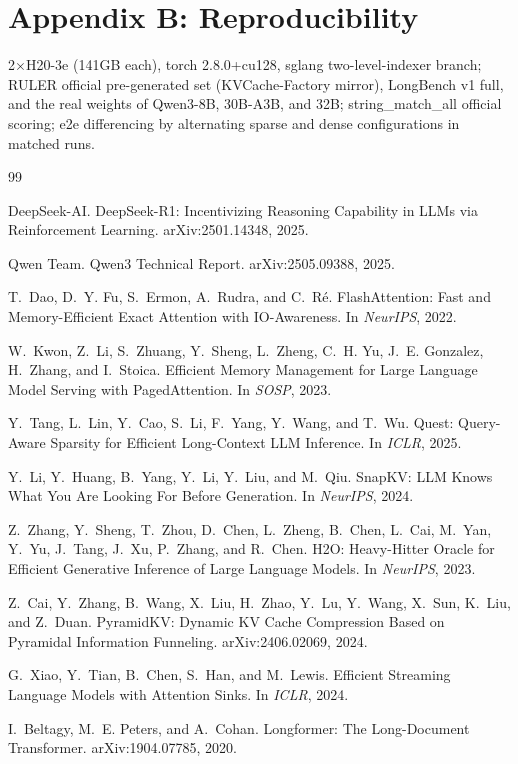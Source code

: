 \documentclass[11pt]{article}
\begin{document}
\section*{Appendix B: Reproducibility}
2$\times$H20-3e (141GB each), torch 2.8.0+cu128, sglang two-level-indexer branch; RULER official pre-generated set (KVCache-Factory mirror), LongBench v1 full, and the real weights of Qwen3-8B, 30B-A3B, and 32B; string\_match\_all official scoring; e2e differencing by alternating sparse and dense configurations in matched runs.


\begin{thebibliography}{99}\small

DeepSeek-AI. DeepSeek-R1: Incentivizing Reasoning Capability in LLMs via Reinforcement Learning. arXiv:2501.14348, 2025.

Qwen Team. Qwen3 Technical Report. arXiv:2505.09388, 2025.

T.~Dao, D.~Y. Fu, S.~Ermon, A.~Rudra, and C.~R\'{e}. FlashAttention: Fast and Memory-Efficient Exact Attention with IO-Awareness. In \emph{NeurIPS}, 2022.

W.~Kwon, Z.~Li, S.~Zhuang, Y.~Sheng, L.~Zheng, C.~H. Yu, J.~E. Gonzalez, H.~Zhang, and I.~Stoica. Efficient Memory Management for Large Language Model Serving with PagedAttention. In \emph{SOSP}, 2023.

Y.~Tang, L.~Lin, Y.~Cao, S.~Li, F.~Yang, Y.~Wang, and T.~Wu. Quest: Query-Aware Sparsity for Efficient Long-Context LLM Inference. In \emph{ICLR}, 2025.

Y.~Li, Y.~Huang, B.~Yang, Y.~Li, Y.~Liu, and M.~Qiu. SnapKV: LLM Knows What You Are Looking For Before Generation. In \emph{NeurIPS}, 2024.

Z.~Zhang, Y.~Sheng, T.~Zhou, D.~Chen, L.~Zheng, B.~Chen, L.~Cai, M.~Yan, Y.~Yu, J.~Tang, J.~Xu, P.~Zhang, and R.~Chen. H2O: Heavy-Hitter Oracle for Efficient Generative Inference of Large Language Models. In \emph{NeurIPS}, 2023.

Z.~Cai, Y.~Zhang, B.~Wang, X.~Liu, H.~Zhao, Y.~Lu, Y.~Wang, X.~Sun, K.~Liu, and Z.~Duan. PyramidKV: Dynamic KV Cache Compression Based on Pyramidal Information Funneling. arXiv:2406.02069, 2024.

G.~Xiao, Y.~Tian, B.~Chen, S.~Han, and M.~Lewis. Efficient Streaming Language Models with Attention Sinks. In \emph{ICLR}, 2024.

I.~Beltagy, M.~E. Peters, and A.~Cohan. Longformer: The Long-Document Transformer. arXiv:1904.07785, 2020.


\end{thebibliography}
\end{document}
